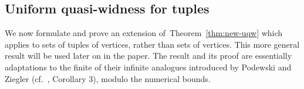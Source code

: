 %
%



\subsection{Uniform quasi-widness for tuples}\label{sec:uqw-tuples}
We now formulate and prove an extension of~Theorem~\ref{thm:new-uqw}
which applies to sets of tuples of vertices, rather than sets of vertices. 
This more general result will be used later on in the paper. 
The result and its proof are essentially adaptations to the finite of their infinite analogues introduced by Podewski and Ziegler (cf.~\cite{podewski1978stable},  Corollary 3),
modulo the numerical bounds.

